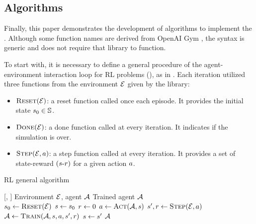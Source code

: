\documentclass[conference]{IEEEtran}
\begin{document}

\subsection{Algorithms}\label{algorithms}

Finally, this paper demonstrates the development of algorithms to implement the {\Qagent}.
Although some function names are derived from OpenAI Gym \cite{OpenAIGym}, the syntax is generic and does not require that library to function.

To start with, it is necessary to define a general procedure of the agent-environment interaction loop for RL problems (), as in .
Each iteration utilized three functions from the environment $\mathcal{E}$ given by the library:
\begin{itemize}
    \item $\function{Reset}(\environment)$: a reset function called once each episode. It provides the initial state $s_0 \in \mathbb{S}$.
    \item $\function{Done}(\environment)$: a done function called at every iteration. It indicates if the simulation is over.
    \item $\function{Step}(\environment, \action)$: a step function called at every iteration. It provides a set of state-reward $(s\textrm{-}r)$ for a given action $a$.
\end{itemize}
\begin{algorithm}[h]
    \caption{RL general algorithm}
    \begin{algorithmic}[1]
        [\environment, \agent]
        \INPUT   Environment $\mathcal{E}$, agent $\mathcal{A}$
        \OUTPUT  Trained agent $\mathcal{A}$
        \\
            \STATE $ \state_0  \gets \function{Reset}(\environment) $
            \STATE $ s  \gets s_0 $
            \STATE $ r \gets 0 $
                \STATE $ \action \gets \function{Act}(\agent, \state) $
                \STATE $ \nextstate, \reward \gets \function{Step}(\environment, \action) $
                \STATE $ \agent \gets \function{Train}(\agent, \state, \action, \nextstate, \reward) $
                \STATE $ s \gets s^{\prime} $
            \ENDWHILE
        \ENDFOR
        \RETURN $\mathcal{A}$
    \end{algorithmic}
    \label{RL algorithm}
\end{algorithm}
\end{document}
